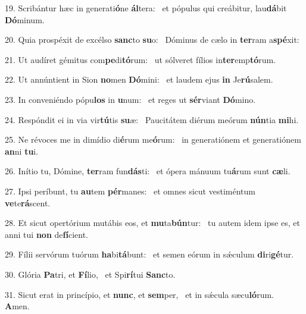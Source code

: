 19. Scribántur hæc in generati\textbf{ó}ne \textbf{ál}tera: \ast\  et pópulus qui creábitur, lau\textbf{dá}bit \textbf{Dó}minum.\

20. Quia prospéxit de excélso \textbf{sanc}to \textbf{su}o: \ast\  Dóminus de cælo in \textbf{ter}ram a\textbf{spé}xit:\

21. Ut audíret gémitus com\textbf{pe}di\textbf{tó}rum: \ast\  ut sólveret fílios in\textbf{ter}emp\textbf{tó}rum.\

22. Ut annúntient in Sion \textbf{no}men \textbf{Dó}mini: \ast\  et laudem ejus \textbf{in} Je\textbf{rú}salem.\

23. In conveniéndo pópu\textbf{los} in \textbf{u}num: \ast\  et reges ut \textbf{sér}viant \textbf{Dó}mino.\

24. Respóndit ei in via vir\textbf{tú}tis \textbf{su}æ: \ast\  Paucitátem diérum meórum \textbf{nún}tia \textbf{mi}hi.\

25. Ne révoces me in dimídio di\textbf{é}rum me\textbf{ó}rum: \ast\  in generatiónem et generatiónem \textbf{an}ni \textbf{tu}i.\

26. Inítio tu, Dómine, \textbf{ter}ram fun\textbf{dás}ti: \ast\  et ópera mánuum tu\textbf{á}rum sunt \textbf{cæ}li.\

27. Ipsi períbunt, tu \textbf{au}tem \textbf{pér}manes: \ast\  et omnes sicut vestiméntum \textbf{ve}te\textbf{rá}scent.\

28. Et sicut opertórium mutábis eos, et \textbf{mu}ta\textbf{bún}tur: \ast\  tu autem idem ipse es, et anni tui \textbf{non} de\textbf{fí}cient.\

29. Fílii servórum tuórum \textbf{ha}bi\textbf{tá}bunt: \ast\  et semen eórum in sǽculum \textbf{di}ri\textbf{gé}tur.\

30. Glória \textbf{Pa}tri, et \textbf{Fí}lio, \ast\  et Spi\textbf{rí}tui \textbf{Sanc}to.\

31. Sicut erat in princípio, et \textbf{nunc}, et \textbf{sem}per, \ast\  et in sǽcula sæcu\textbf{ló}rum. \textbf{A}men.\

